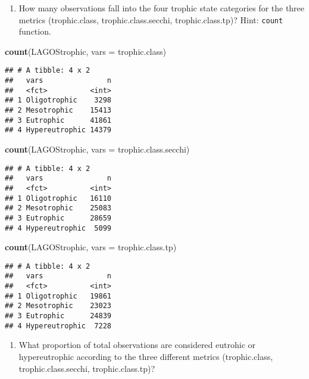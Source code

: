 \documentclass[]{article}
\newenvironment{Shaded}{\begin{snugshade}}{\end{snugshade}}
\newcommand{\DataTypeTok}[1]{\textcolor[rgb]{0.13,0.29,0.53}{#1}}
\newcommand{\KeywordTok}[1]{\textcolor[rgb]{0.13,0.29,0.53}{\textbf{#1}}}
\newcommand{\NormalTok}[1]{#1}
\providecommand{\tightlist}{%
  \setlength{\itemsep}{0pt}\setlength{\parskip}{0pt}}
\begin{document}
\begin{enumerate}
\def\labelenumi{\arabic{enumi}.}
\setcounter{enumi}{5}
\tightlist
\item
  How many observations fall into the four trophic state categories for
  the three metrics (trophic.class, trophic.class.secchi,
  trophic.class.tp)? Hint: \texttt{count} function.
\end{enumerate}

\begin{Shaded}
\begin{Highlighting}[]
\KeywordTok{count}\NormalTok{(LAGOStrophic, }\DataTypeTok{vars =}\NormalTok{ trophic.class)}
\end{Highlighting}
\end{Shaded}

\begin{verbatim}
## # A tibble: 4 x 2
##   vars               n
##   <fct>          <int>
## 1 Oligotrophic    3298
## 2 Mesotrophic    15413
## 3 Eutrophic      41861
## 4 Hypereutrophic 14379
\end{verbatim}

\begin{Shaded}
\begin{Highlighting}[]
\KeywordTok{count}\NormalTok{(LAGOStrophic, }\DataTypeTok{vars =}\NormalTok{ trophic.class.secchi)}
\end{Highlighting}
\end{Shaded}

\begin{verbatim}
## # A tibble: 4 x 2
##   vars               n
##   <fct>          <int>
## 1 Oligotrophic   16110
## 2 Mesotrophic    25083
## 3 Eutrophic      28659
## 4 Hypereutrophic  5099
\end{verbatim}

\begin{Shaded}
\begin{Highlighting}[]
\KeywordTok{count}\NormalTok{(LAGOStrophic, }\DataTypeTok{vars =}\NormalTok{ trophic.class.tp)}
\end{Highlighting}
\end{Shaded}

\begin{verbatim}
## # A tibble: 4 x 2
##   vars               n
##   <fct>          <int>
## 1 Oligotrophic   19861
## 2 Mesotrophic    23023
## 3 Eutrophic      24839
## 4 Hypereutrophic  7228
\end{verbatim}

\begin{enumerate}
\def\labelenumi{\arabic{enumi}.}
\setcounter{enumi}{6}
\tightlist
\item
  What proportion of total observations are considered eutrohic or
  hypereutrophic according to the three different metrics
  (trophic.class, trophic.class.secchi, trophic.class.tp)?
\end{enumerate}
\end{document}
